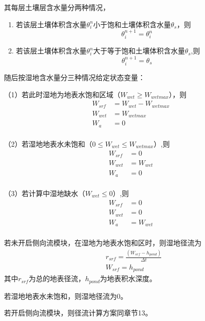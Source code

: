 其每层土壤层含水量分两种情况，
\begin{enumerate}
    \item 若该层土壤体积含水量$\theta_{i}^{n}$小于饱和土壤体积含水量$\theta_{s}$，则
        \begin{equation}
        \theta_{i}^{n+1}=\theta_{i}^{n}
        \end{equation}
    \item 若该层土壤体积含水量$\theta_{i}^{n}$大于等于饱和土壤体积含水量$\theta_{s}$,则
        \begin{equation}
        \theta_{i}^{n+1}=\theta_{s}
        \end{equation}
\end{enumerate}

随后按湿地含水量分三种情况给定状态变量：

（1）若此时湿地为地表水饱和区域（$W_{wet} \geq W_{wetmax}$），则
\begin{equation}
\begin{aligned}
W_{srf}&=W_{wet}-W_{wetmax} \\
W_{wet}&=W_{wetmax} \\
W_{a}&=0 \\
\end{aligned}
\end{equation}

（2）若湿地地表水未饱和（$0 \leq W_{wet} \leq W_{wetmax}$）,则
\begin{equation}
\begin{aligned}
W_{srf}&=0 \\
W_{wet}&=W_{wet} \\
W_{a}&=0 \\
\end{aligned}
\end{equation}

（3）若计算中湿地缺水（$W_{wet} \leq 0$）,则
\begin{equation}
\begin{aligned}
W_{srf}&=0 \\
W_{wet}&=0 \\
W_{a}&=W_{wet} \\
\end{aligned}
\end{equation}

若未开启侧向流模块，在湿地为地表水饱和区时，则湿地径流为
\begin{equation}
\begin{aligned}
&r_{srf}=\frac{\left(W_{srf}-h_{pond}\right)}{\Delta t} \\
&W_{srf}=h_{pond}
\end{aligned}
\end{equation}
其中$r_{srf}$为总的地表径流，$h_{pond}$为地表积水深度。

若湿地地表水未饱和，则湿地径流为0。

若开启侧向流模块，则径流计算方案同章节13。

